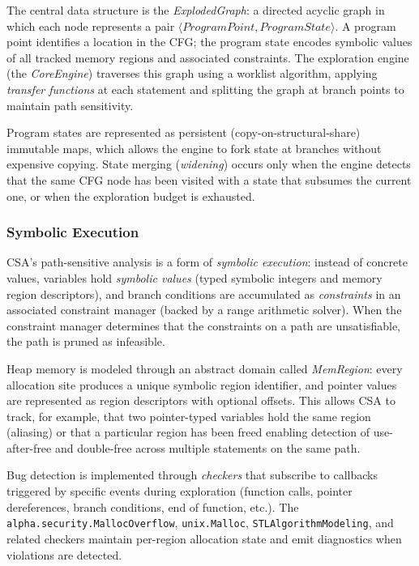 \documentclass[11pt,a4paper]{article}
\begin{document}
The central data structure is the \emph{ExplodedGraph}: a directed acyclic graph in which each node represents a pair $\langle \mathit{ProgramPoint}, \mathit{ProgramState} \rangle$. A program point identifies a location in the CFG; the program state encodes symbolic values of all tracked memory regions and associated constraints. The exploration engine (the \emph{CoreEngine}) traverses this graph using a worklist algorithm, applying \emph{transfer functions} at each statement and splitting the graph at branch points to maintain path sensitivity.

Program states are represented as persistent (copy-on-structural-share) immutable maps, which allows the engine to fork state at branches without expensive copying. State merging (\emph{widening}) occurs only when the engine detects that the same CFG node has been visited with a state that subsumes the current one, or when the exploration budget is exhausted.

\subsubsection{Symbolic Execution}

CSA's path-sensitive analysis is a form of \emph{symbolic execution}: instead of concrete values, variables hold \emph{symbolic values} (typed symbolic integers and memory region descriptors), and branch conditions are accumulated as \emph{constraints} in an associated constraint manager (backed by a range arithmetic solver). When the constraint manager determines that the constraints on a path are unsatisfiable, the path is pruned as infeasible.

Heap memory is modeled through an abstract domain called \emph{MemRegion}: every allocation site produces a unique symbolic region identifier, and pointer values are represented as region descriptors with optional offsets. This allows CSA to track, for example, that two pointer-typed variables hold the same region (aliasing) or that a particular region has been freed enabling detection of use-after-free and double-free across multiple statements on the same path.

Bug detection is implemented through \emph{checkers} that subscribe to callbacks triggered by specific events during exploration (function calls, pointer dereferences, branch conditions, end of function, etc.). The \texttt{alpha.security.MallocOverflow}, \texttt{unix.Malloc}, \texttt{STLAlgorithmModeling}, and related checkers maintain per-region allocation state and emit diagnostics when violations are detected.
\end{document}
